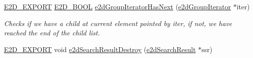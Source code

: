\begin{DoxyCompactItemize}
\hyperlink{Ez2DS_8h_a9f14e9cb869e1a85fdaba03afcca0df9}{E2\-D\-\_\-\-E\-X\-P\-O\-R\-T} \hyperlink{Ez2DS_8h_aac8cdc3a3bcd6b56a8c3e0bb6979cbf8}{E2\-D\-\_\-\-B\-O\-O\-L} \hyperlink{group__e2dGroup_ga2e74310ea432fa45cea8b03da8fc29ef}{e2d\-Group\-Iterator\-Has\-Next} (\hyperlink{structe2dGroupIterator}{e2d\-Group\-Iterator} $\ast$iter)
\begin{DoxyCompactList}\small\item\em Checks if we have a child at current element pointed by iter, if not, we have reached the end of the child list. \end{DoxyCompactList}\item 
\hypertarget{group__e2dGroup_ga0775c9a7e2ec5311263f84339afb52bc}{\hyperlink{Ez2DS_8h_a9f14e9cb869e1a85fdaba03afcca0df9}{E2\-D\-\_\-\-E\-X\-P\-O\-R\-T} void \hyperlink{group__e2dGroup_ga0775c9a7e2ec5311263f84339afb52bc}{e2d\-Search\-Result\-Destroy} (\hyperlink{structe2dSearchResult}{e2d\-Search\-Result} $\ast$ssr)}\label{group__e2dGroup_ga0775c9a7e2ec5311263f84339afb52bc}


\end{DoxyCompactItemize}
